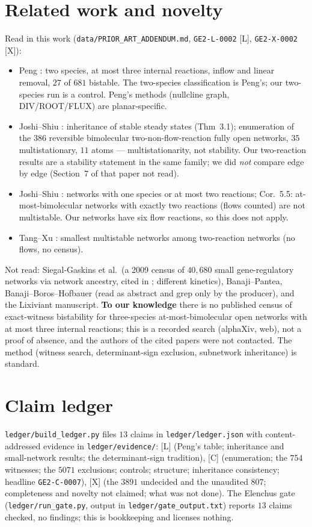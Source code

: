 \documentclass[11pt]{article}
\newcommand{\tier}[1]{\textsf{[#1]}}
\newcommand{\tL}{\tier{L}}
\newcommand{\tC}{\tier{C}}
\newcommand{\tX}{\tier{X}}
\begin{document}
\section{Related work and novelty}\label{sec:related}
Read in this work (\texttt{data/PRIOR\_ART\_ADDENDUM.md}, \texttt{GE2-L-0002} \tL{}, \texttt{GE2-X-0002} \tX{}):
\begin{itemize}\itemsep=0pt
\item Peng \cite{peng}: two species, at most three internal reactions, inflow and linear removal, $27$ of $681$ bistable. The two-species classification is Peng's; our two-species run is a control. Peng's methods (nullcline graph, DIV/ROOT/FLUX) are planar-specific.
\item Joshi--Shiu \cite{atoms}: inheritance of stable steady states (Thm~3.1); enumeration of the $386$ reversible bimolecular two-non-flow-reaction fully open networks, $35$ multistationary, $11$ atoms --- multistationarity, not stability. Our two-reaction results are a stability statement in the same family; we did \emph{not} compare edge by edge (Section~7 of that paper not read).
\item Joshi--Shiu \cite{js16}: networks with one species or at most two reactions; Cor.~5.5: at-most-bimolecular networks with exactly two reactions (flows counted) are not multistable. Our networks have six flow reactions, so this does not apply.
\item Tang--Xu \cite{tx}: smallest multistable networks among two-reaction networks (no flows, no census).
\end{itemize}
Not read: Siegal-Gaskins et al.\ (a 2009 census of $40{,}680$ small gene-regulatory networks via network ancestry, cited in \cite{atoms}; different kinetics), Banaji--Pantea, Banaji--Boros--Hofbauer (read as abstract and grep only by the producer), and the Lixiviant manuscript. \textbf{To our knowledge} there is no published census of exact-witness bistability for three-species at-most-bimolecular open networks with at most three internal reactions; this is a recorded search (alphaXiv, web), not a proof of absence, and the authors of the cited papers were not contacted. The method (witness search, determinant-sign exclusion, subnetwork inheritance) is standard.

\section{Claim ledger}\label{sec:ledger}
\texttt{ledger/build\_ledger.py} files $13$ claims in \texttt{ledger/ledger.json} with content-addressed evidence in \texttt{ledger/evidence/}: \tL{} (Peng's table; inheritance and small-network results; the determinant-sign tradition), \tC{} (enumeration; the $754$ witnesses; the $5071$ exclusions; controls; structure; inheritance consistency; headline \texttt{GE2-C-0007}), \tX{} (the $3891$ undecided and the unaudited $807$; completeness and novelty not claimed; what was not done). The Elenchus gate (\texttt{ledger/run\_gate.py}, output in \texttt{ledger/gate\_output.txt}) reports $13$ claims checked, no findings; this is bookkeeping and licenses nothing.
\end{document}
